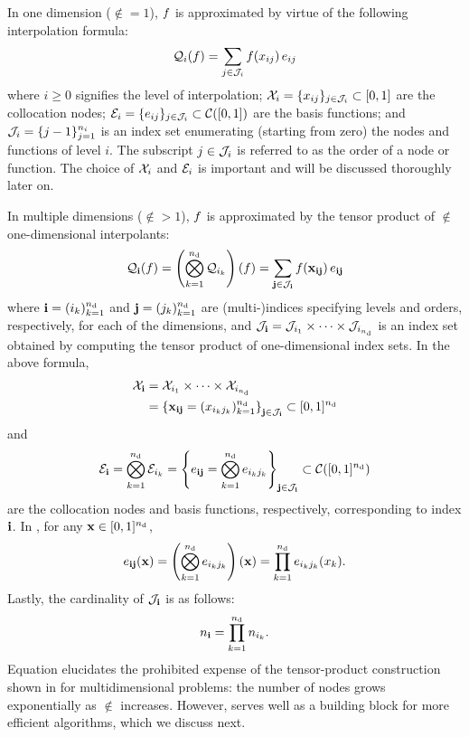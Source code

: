 In one dimension ($\nin = 1$), $f$ is approximated by virtue of the following
interpolation formula:
\begin{equation} \elab{tensor-1d}
  \tensor{i}(\f) = \sum_{j \in \oindex_i} \f(\x_{ij}) \, \e_{ij}
\end{equation}
where $i \geq 0$ signifies the level of interpolation; $\mathcal{X}_i = \{ x_{ij} \}_{j
\in \mathcal{J}_i} \subset [0, 1]$ are the collocation nodes; $\mathcal{E}_i = \{ e_{ij}
\}_{j \in \mathcal{J}_i} \subset \mathcal{C}([0, 1])$ are the basis functions; and
$\mathcal{J}_i = \{ j - 1 \}_{j = 1}^{n_i}$ is an index set enumerating (starting
from zero) the nodes and functions of level $i$. The subscript $j \in \mathcal{J}_i$
is referred to as the order of a node or function. The choice of $\mathcal{X}_i$ and
$\mathcal{E}_i$ is important and will be discussed thoroughly later on.

In multiple dimensions ($\nin > 1$), $f$ is approximated by the tensor product
of $\nin$ one-dimensional interpolants:
\begin{equation} \elab{tensor-nd}
  \tensor{\vi}(\f) = \left( \bigotimes_{k = 1}^\nin \tensor{i_k} \right)(\f) = \sum_{\vj \in \oindex_\vi} \f(\vx_{\vi\vj}) \, \e_{\vi\vj}
\end{equation}
where $\mathbf{i} = (i_k)_{k = 1}^{n_\text{d}}$ and $\mathbf{j} = (j_k)_{k = 1}^{n_\text{d}}$ are
(multi-)indices specifying levels and orders, respectively, for each of the
dimensions, and $\mathcal{J}_{\mathbf{i}} = \mathcal{J}_{i_1} \times \cdots \times
\mathcal{J}_{i_{n_\text{d}}}$ is an index set obtained by computing the tensor product of
one-dimensional index sets. In the above formula,
\begin{align}
  \X_\vi &= \X_{i_1} \times \cdots \times \X_{i_\nin} \elab{collocation-nodes} \\
         &= \left\{ \vx_{\vi\vj} = (\x_{i_k j_k})_{k = 1}^\nin \right\}_{\vj \in \oindex_\vi} \subset [0, 1]^\nin \nonumber
\end{align}
and
\begin{equation} \elab{basis-functions}
  \E_\vi = \bigotimes_{k = 1}^\nin \E_{i_k}
         = \left\{ \e_{\vi\vj} = \bigotimes_{k = 1}^\nin \e_{i_k j_k} \right\}_{\vj \in \oindex_\vi} \subset \continuous([0, 1]^\nin)
\end{equation}
are the collocation nodes and basis functions, respectively, corresponding to
index $\mathbf{i}$. In , for any $\mathbf{x} \in [0, 1]^{n_\text{d}}$,
\begin{equation} \elab{basis-function}
  \e_{\vi\vj}(\vx) = \left( \bigotimes_{k = 1}^\nin \e_{i_k j_k} \right)(\vx) = \prod_{k = 1}^\nin \e_{i_k j_k}(\x_k).
\end{equation}
Lastly, the cardinality of $\mathcal{J}_{\mathbf{i}}$ is as follows:
\begin{equation} \elab{tensor-cardinality}
  \n_\vi = \prod_{k = 1}^\nin \n_{i_k}.
\end{equation}
Equation  elucidates the prohibited expense of the
tensor-product construction shown in  for multidimensional
problems: the number of nodes grows exponentially as $\nin$ increases. However,
 serves well as a building block for more efficient algorithms,
which we discuss next.

